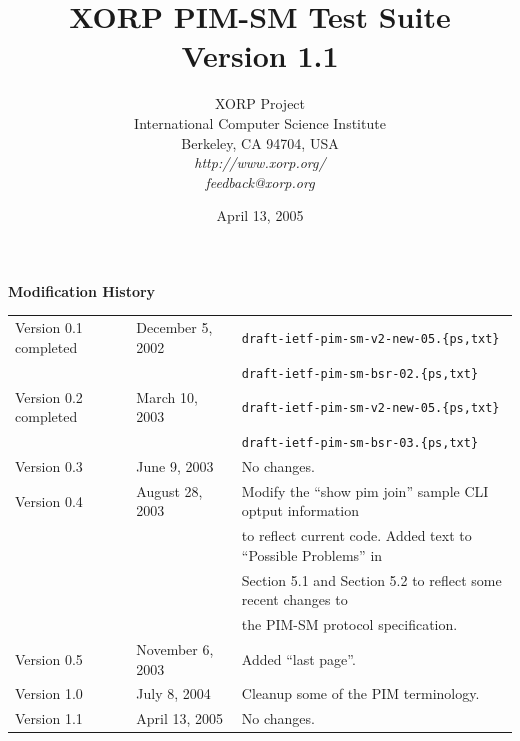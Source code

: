 \documentclass[11pt]{report}
\begin{document}
\title{XORP PIM-SM Test Suite \\
\vspace{1ex}
Version 1.1}
\author{ XORP Project                                   \\
         International Computer Science Institute       \\
         Berkeley, CA 94704, USA                        \\
         {\it http://www.xorp.org/}			\\
         {\it feedback@xorp.org}
}
\date{April 13, 2005}

\maketitle

\thispagestyle{empty}


\newpage
\thispagestyle{empty}
{\huge \bf Modification History}
\vspace{4ex}

\begin{tabular}{lll}
Version 0.1 completed	& December 5, 2002 & \verb=draft-ietf-pim-sm-v2-new-05.{ps,txt}= \\
			&		   & \verb=draft-ietf-pim-sm-bsr-02.{ps,txt}= \\
Version 0.2 completed	& March 10, 2003 & \verb=draft-ietf-pim-sm-v2-new-05.{ps,txt}= \\
			&		   & \verb=draft-ietf-pim-sm-bsr-03.{ps,txt}= \\
Version 0.3		& June 9, 2003	   & No changes. \\
Version 0.4		& August 28, 2003  & Modify the ``show pim join''
			sample CLI optput information \\
			&		   & to reflect current code. Added
			text to ``Possible Problems'' in \\
			&		   & Section 5.1 and Section 5.2 to
			reflect some recent changes to \\
			&		   & the PIM-SM protocol
			specification. \\
Version 0.5		& November 6, 2003 & Added ``last page''. \\
Version 1.0		& July 8, 2004 & Cleanup some of the PIM
			terminology. \\
Version 1.1		& April 13, 2005	& No changes. \\
\end{tabular}

\tableofcontents
\listoftables
\listoffigures
\end{document}
